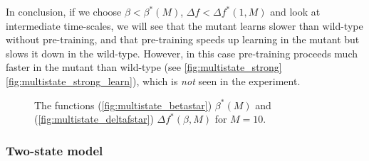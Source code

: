 \documentclass[12pt]{article}
\begin{document}
In conclusion, if we choose $\beta<\beta^*(M)$, $\Delta f < \Delta f^*(1,M)$ and look at intermediate time-scales, we will see that the mutant learns slower than wild-type without pre-training, and that pre-training speeds up learning in the mutant but slows it down in the wild-type.
However, in this case pre-training proceeds much faster in the mutant than wild-type (see \autoref{fig:multistate_strong}\ref{fig:multistate_strong_learn}), which is \emph{not} seen in the experiment.



\begin{figure}
 \begin{center}
 \begin{myenuma}
  \item{}\label{fig:multistate_betastar}
  \item{}\label{fig:multistate_deltafstar}
 \end{myenuma}
 \end{center}
  \caption{The functions (\ref{fig:multistate_betastar}) $\beta^*(M)$ and (\ref{fig:multistate_deltafstar}) $\Delta f^*(\beta,M)$ for $M=10$.}\label{fig:multistate_star}
\end{figure}



\subsubsection{Two-state model}\label{sec:binary}
\end{document}
